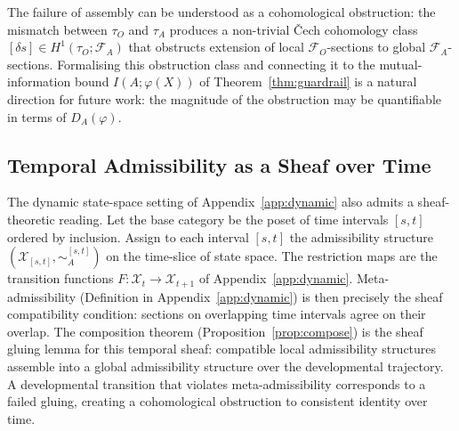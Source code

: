 \documentclass[10pt,twocolumn]{article}
\theoremstyle{plain}
\theoremstyle{definition}
\theoremstyle{remark}
\newcommand{\DA}{D_{A}(\varphi)}
\newcommand{\calX}{\mathcal{X}}
\begin{document}
The failure of assembly can be understood as a cohomological obstruction: the
mismatch between $\tau_O$ and $\tau_A$ produces a non-trivial \v{C}ech
cohomology class $[\delta s]\in H^1(\tau_O;\mathcal{F}_A)$ that obstructs
extension of local $\mathcal{F}_O$-sections to global $\mathcal{F}_A$-sections.
Formalising this obstruction class and connecting it to the mutual-information
bound $I(A;\varphi(X))$ of Theorem~\ref{thm:guardrail} is a natural direction
for future work: the magnitude of the obstruction may be quantifiable in terms
of $\DA$.

\subsection*{Temporal Admissibility as a Sheaf over Time}

The dynamic state-space setting of Appendix~\ref{app:dynamic} also admits a
sheaf-theoretic reading. Let the base category be the poset of time intervals
$[s,t]$ ordered by inclusion. Assign to each interval $[s,t]$ the admissibility
structure $(\calX_{[s,t]},\sim_A^{[s,t]})$ on the time-slice of state space. The
restriction maps are the transition functions $F:\calX_t\to\calX_{t+1}$ of
Appendix~\ref{app:dynamic}. Meta-admissibility (Definition in
Appendix~\ref{app:dynamic}) is then precisely the sheaf compatibility condition:
sections on overlapping time intervals agree on their overlap. The composition
theorem (Proposition~\ref{prop:compose}) is the sheaf gluing lemma for this
temporal sheaf: compatible local admissibility structures assemble into a global
admissibility structure over the developmental trajectory. A developmental
transition that violates meta-admissibility corresponds to a failed gluing,
creating a cohomological obstruction to consistent identity over time.

\end{document}
